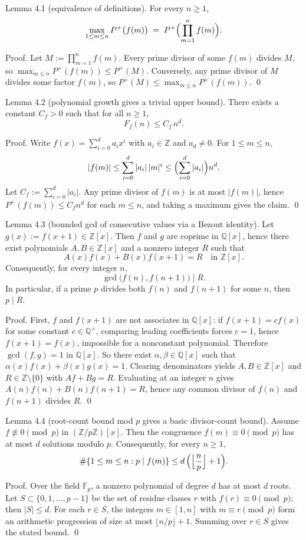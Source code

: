 Lemma 4.1 (equivalence of definitions).
For every $n\ge 1$,
\[
\max_{1\le m\le n} P^+\bigl(f(m)\bigr)
\;=\; P^+\Bigl(\prod_{m=1}^n f(m)\Bigr).
\]

Proof.
Let $M:=\prod_{m=1}^n f(m)$. Every prime divisor of some $f(m)$ divides $M$, so
$\max_{m\le n}P^+(f(m))\le P^+(M)$. Conversely, any prime divisor of $M$ divides some factor $f(m)$,
so $P^+(M)\le \max_{m\le n}P^+(f(m))$. \qed

Lemma 4.2 (polynomial growth gives a trivial upper bound).
There exists a constant $C_f>0$ such that for all $n\ge 1$,
\[
F_f(n)\le C_f\, n^d.
\]

Proof.
Write $f(x)=\sum_{i=0}^d a_i x^i$ with $a_i\in\mathbb Z$ and $a_d\ne 0$.
For $1\le m\le n$,
\[
|f(m)|\le \sum_{i=0}^d |a_i|\, |m|^i\le \Bigl(\sum_{i=0}^d |a_i|\Bigr) n^d.
\]
Let $C_f:=\sum_{i=0}^d |a_i|$. Any prime divisor of $f(m)$ is at most $|f(m)|$, hence
$P^+(f(m))\le C_f n^d$ for each $m\le n$, and taking a maximum gives the claim. \qed

Lemma 4.3 (bounded gcd of consecutive values via a Bezout identity).
Let $g(x):=f(x+1)\in\mathbb Z[x]$. Then $f$ and $g$ are coprime in $\mathbb Q[x]$, hence there exist
polynomials $A,B\in\mathbb Z[x]$ and a nonzero integer $R$ such that
\[
A(x)f(x)+B(x)f(x+1)=R\quad\text{in }\mathbb Z[x].
\]
Consequently, for every integer $n$,
\[
\gcd\bigl(f(n),f(n+1)\bigr)\mid R.
\]
In particular, if a prime $p$ divides both $f(n)$ and $f(n+1)$ for some $n$, then $p\mid R$.

Proof.
First, $f$ and $f(x+1)$ are not associates in $\mathbb Q[x]$: if $f(x+1)=c f(x)$ for some constant $c\in\mathbb Q^\times$, comparing leading coefficients forces $c=1$, hence $f(x+1)=f(x)$, impossible for a nonconstant polynomial. Therefore $\gcd(f,g)=1$ in $\mathbb Q[x]$.
So there exist $\alpha,\beta\in\mathbb Q[x]$ such that $\alpha(x)f(x)+\beta(x)g(x)=1$.
Clearing denominators yields $A,B\in\mathbb Z[x]$ and $R\in\mathbb Z\setminus\{0\}$ with
$A f + B g = R$.
Evaluating at an integer $n$ gives $A(n)f(n)+B(n)f(n+1)=R$, hence any common divisor of $f(n)$ and $f(n+1)$ divides $R$. \qed

Lemma 4.4 (root-count bound mod $p$ gives a basic divisor-count bound).
Assume $f\not\equiv 0\pmod p$ in $(\mathbb Z/p\mathbb Z)[x]$.
Then the congruence $f(m)\equiv 0\pmod p$ has at most $d$ solutions modulo $p$.
Consequently, for every $n\ge 1$,
\[
\#\{1\le m\le n: p\mid f(m)\}\le d\,\Bigl(\Bigl\lfloor\frac{n}{p}\Bigr\rfloor+1\Bigr).
\]

Proof.
Over the field $\mathbb F_p$, a nonzero polynomial of degree $d$ has at most $d$ roots.
Let $S\subset\{0,1,\dots,p-1\}$ be the set of residue classes $r$ with $f(r)\equiv 0\pmod p$; then $|S|\le d$.
For each $r\in S$, the integers $m\in[1,n]$ with $m\equiv r\pmod p$ form an arithmetic progression
of size at most $\lfloor n/p\rfloor+1$. Summing over $r\in S$ gives the stated bound. \qed

